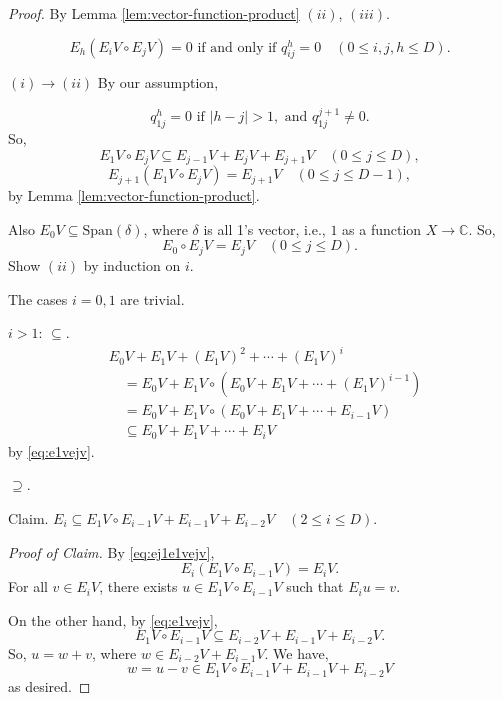 \documentclass[
]{book}
\theoremstyle{definition}
\theoremstyle{definition}
\theoremstyle{definition}
\theoremstyle{definition}
\theoremstyle{remark}
\begin{document}
\begin{proof}
\leavevmode

By Lemma \ref{lem:vector-function-product} \((ii)\), \((iii)\).

\[E_h(E_iV\circ E_jV) = 0 \text{ if and only if } q^h_{ij} = 0 \quad (0\leq i,j,h\leq D).\]

\((i)\to(ii)\) By our assumption,

\[q^h_{1j} = 0 \text{ if } |h-j|>1, \text{ and } q^{j+1}_{1j}\neq 0.\]
So,
\begin{equation}
E_1V\circ E_jV \subseteq E_{j-1}V + E_jV + E_{j+1}V \quad (0\leq j\leq D), \label{eq:e1vejv}
\end{equation}
\begin{equation}
E_{j+1}(E_1V\circ E_jV) = E_{j+1}V \quad (0\leq j\leq D-1), \label{eq:ej1e1vejv}
\end{equation}
by Lemma \ref{lem:vector-function-product}.

Also \(E_0V \subseteq \mathrm{Span}(\delta)\), where \(\delta\) is all 1's vector, i.e., \(1\) as a function \(X\to \mathbb{C}\).
So,
\begin{equation}
E_0\circ E_jV = E_jV \quad (0\leq j\leq D). \label{eq:e0vejv}
\end{equation}
Show \((ii)\) by induction on \(i\).

The cases \(i=0, 1\) are trivial.

\(i>1\): \(\subseteq\).
\begin{align}
& E_0V + E_1V + (E_1V)^2 + \cdots + (E_1V)^i\\
& \quad = E_0V + E_1V\circ (E_0V + E_1V + \cdots + (E_1V)^{i-1})\\
& \quad = E_0V + E_1V\circ (E_0V + E_1V + \cdots + E_{i-1}V)\\
& \quad \subseteq E_0V  + E_1V + \cdots + E_{i}V
\end{align}
by \eqref{eq:e1vejv}.

\(\supseteq\).

Claim. \(E_i\subseteq E_1V\circ E_{i-1}V + E_{i-1}V + E_{i-2}V \quad (2\leq i\leq D)\).

\emph{Proof of Claim.} By \eqref{eq:ej1e1vejv},
\[E_i(E_1V \circ E_{i-1}V) = E_iV.\]
For all \(v\in E_i V\), there exists \(u\in E_1V\circ E_{i-1}V\) such that \(E_iu = v\).

On the other hand, by \eqref{eq:e1vejv},
\[E_1V\circ E_{i-1}V \subseteq E_{i-2}V + E_{i-1}V + E_{i-2}V.\]
So, \(u = w+v\), where \(w\in E_{i-2}V + E_{i-1}V\). We have,
\[w = u-v \in E_1V \circ E_{i-1}V + E_{i-1}V + E_{i-2}V\]
as desired.


\end{proof}
\end{document}
